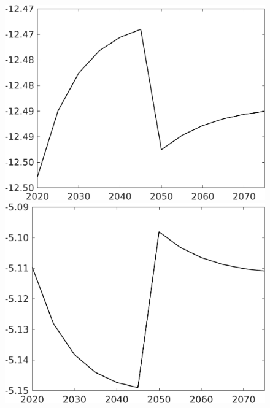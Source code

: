 \documentclass[12pt]{article}
\begin{document}
\begin{figure}[h!!]
\begin{minipage}[]{0.32\textwidth}
		\includegraphics[width=1\textwidth]{../../codding_model/own_basedOnFried/optimalPol_010922_revision/figures/all_13Sept22/CompTaufPER_bytaul_Equlab_Reg0_hh_spillover0_nsk0_xgr0_knspil0_sep0_LFlimit1_emsbase0_countec0_GovRev0_etaa0.79_lgd0.png}
	\end{minipage}	
	\begin{minipage}[]{0.32\textwidth}
		\includegraphics[width=1\textwidth]{../../codding_model/own_basedOnFried/optimalPol_010922_revision/figures/all_13Sept22/CompTaufPER_bytaul_Equlab_Reg0_hl_spillover0_nsk0_xgr0_knspil0_sep0_LFlimit1_emsbase0_countec0_GovRev0_etaa0.79_lgd0.png}
	\end{minipage}	

\end{figure}
\end{document}

